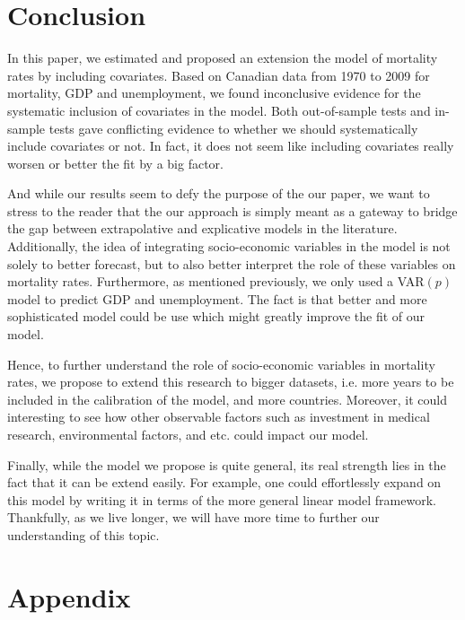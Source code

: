 \documentclass[AER, draftmode]{AEA}
\begin{document}
\section{Conclusion} \label{sec:conclusion}

In this paper, we estimated and proposed an extension the \cite{Brouhns2002} model of mortality rates by including covariates. Based on Canadian data from 1970 to 2009 for mortality, GDP and unemployment, we found inconclusive evidence for the systematic inclusion of covariates in the \cite{Brouhns2002} model. Both out-of-sample tests and in-sample tests gave conflicting evidence to whether we should systematically include covariates or not. In fact, it does not seem like including covariates really worsen or better the fit by a big factor.

And while our results seem to defy the purpose of the our paper, we want to stress to the reader that the our approach is simply meant as a gateway to bridge the gap between extrapolative and explicative models in the literature. Additionally, the idea of integrating socio-economic variables in the model is not solely to better forecast, but to also better interpret the role of these variables on mortality rates. Furthermore, as mentioned previously, we only used a VAR$(p)$ model to predict GDP and unemployment. The fact is that better and more sophisticated model could be use which might greatly improve the fit of our model.

Hence, to further understand the role of socio-economic variables in mortality rates, we propose to extend this research to bigger datasets, i.e. more years to be included in the calibration of the model, and more countries. Moreover, it could interesting to see how other observable factors such as investment in medical research,  environmental factors, and etc. could impact our model. 

Finally, while the model we propose is quite general, its real strength lies in the fact that it can be extend easily. For example, one could effortlessly expand on this model by writing it in terms of the more general linear model framework. Thankfully, as we live longer, we will have more time to further our understanding of this topic.




\clearpage

\section{Appendix}
\end{document}
